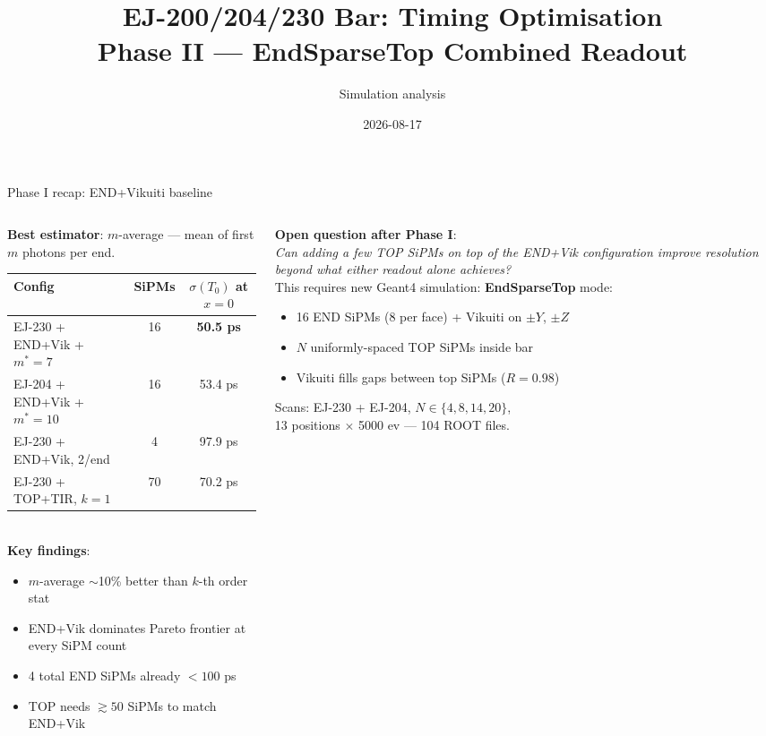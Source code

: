 \documentclass[aspectratio=169,9pt]{beamer}
\title[Bar Timing Optimisation]{EJ-200/204/230 Bar: Timing Optimisation\\Phase II — EndSparseTop Combined Readout}
\author{Simulation analysis}
\date{2026-08-17}
\begin{document}
\begin{frame}
\titlepage
\end{frame}

\begin{frame}{Phase I recap: END+Vikuiti baseline}
\begin{columns}[T]
\begin{column}{0.52\textwidth}
\textbf{Best estimator}: $m$-average — mean of first $m$ photons per end.\\[0.4em]
\footnotesize
\begin{tabular}{lcc}
\toprule
Config & SiPMs & $\sigma(T_0)$ at $x{=}0$\\
\midrule
\rowcolor{rowbest}
EJ-230 + END+Vik + $m^*{=}7$ & 16 & \textbf{50.5 ps}\\
EJ-204 + END+Vik + $m^*{=}10$ & 16 & 53.4 ps\\
EJ-230 + END+Vik, 2/end       &  4 & 97.9 ps\\
EJ-230 + TOP+TIR, $k{=}1$     & 70 & 70.2 ps\\
\bottomrule
\end{tabular}\\[0.5em]
\normalsize
\textbf{Key findings}:
\begin{itemize}\footnotesize
  \item $m$-average $\sim$10\% better than $k$-th order stat
  \item END+Vik dominates Pareto frontier at every SiPM count
  \item 4 total END SiPMs already $<100$ ps
  \item TOP needs $\gtrsim 50$ SiPMs to match END+Vik
\end{itemize}
\end{column}
\begin{column}{0.44\textwidth}
\textbf{Open question after Phase I}:\\[0.3em]
\textit{Can adding a few TOP SiPMs on top of the END+Vik configuration improve resolution beyond what either readout alone achieves?}\\[0.6em]
\footnotesize
This requires new Geant4 simulation: \textbf{EndSparseTop} mode:
\begin{itemize}
  \item 16 END SiPMs (8 per face) + Vikuiti on $\pm Y$, $\pm Z$
  \item $N$ uniformly-spaced TOP SiPMs inside bar
  \item Vikuiti fills gaps between top SiPMs ($R{=}0.98$)
\end{itemize}
\vspace{0.3em}
Scans: EJ-230 + EJ-204, $N\in\{4,8,14,20\}$,\\
13 positions $\times$ 5000 ev — 104 ROOT files.
\end{column}
\end{columns}
\end{frame}
\end{document}
